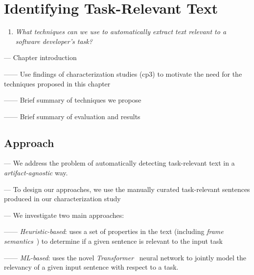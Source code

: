 \setcounter{chapter}{3}
\setcounter{rq}{1}


\chapter{Identifying Task-Relevant Text}
\label{ch:identifying}



\vspace{1mm}

\begin{enumerate}[label=\textit{RQ\arabic*},leftmargin=1.4cm]

\item \textit{What techniques can we use to automatically extract text relevant to a software developer's task?} 

\end{enumerate}

\vspace{1mm}

--- Chapter introduction 

------ Use findings of characterization studies (cp3) to motivate the need for the techniques proposed in this chapter

------ Brief summary of techniques we propose

------ Brief summary of evaluation and results



\section{Approach}

--- We address the problem of automatically detecting task-relevant text in a \textit{artifact-agnostic} way. \vspace{3mm}

--- To design our approaches, we use the manually curated task-relevant sentences produced in our characterization study~\cite{marques2020} \vspace{3mm}

--- We investigate two main approaches:

------ \textit{Heuristic-based}: uses a set of properties in the text (including \textit{frame semantics}~\cite{fillmore1976frame}) to determine if a given sentence is relevant to the input task

------ \textit{ML-based}: uses the novel \textit{Transformer}~\cite{Vaswani2017attention} neural network to jointly model the relevancy of a given input sentence with respect to a task. 


